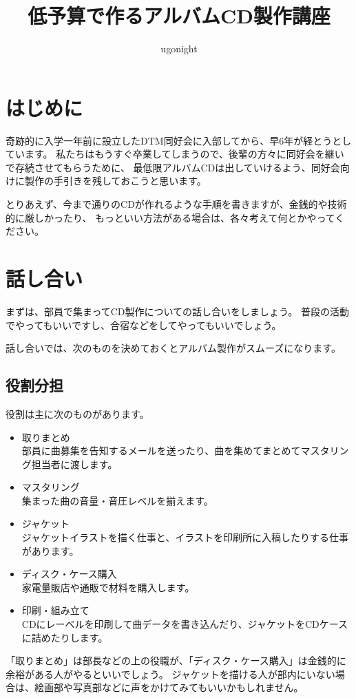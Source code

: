 \documentclass[11pt,a4paper]{jsarticle}
\title{低予算で作るアルバムCD製作講座}
\author{ugonight}
\begin{document}
%
%
    \maketitle

    \tableofcontents

    \section{はじめに}
        奇跡的に入学一年前に設立したDTM同好会に入部してから、早6年が経とうとしています。
        私たちはもうすぐ卒業してしまうので、後輩の方々に同好会を継いで存続させてもらうために、
        最低限アルバムCDは出していけるよう、同好会向けに製作の手引きを残しておこうと思います。
        
        とりあえず、今まで通りのCDが作れるような手順を書きますが、金銭的や技術的に厳しかったり、
        もっといい方法がある場合は、各々考えて何とかやってください。




    \section{話し合い}
        まずは、部員で集まってCD製作についての話し合いをしましょう。
        普段の活動でやってもいいですし、合宿などをしてやってもいいでしょう。

        話し合いでは、次のものを決めておくとアルバム製作がスムーズになります。

        \subsection{役割分担}
            役割は主に次のものがあります。
            \begin{itemize}
                \item 取りまとめ \\
                    部員に曲募集を告知するメールを送ったり、曲を集めてまとめてマスタリング担当者に渡します。
                \item マスタリング \\
                    集まった曲の音量・音圧レベルを揃えます。
                \item ジャケット \\
                    ジャケットイラストを描く仕事と、イラストを印刷所に入稿したりする仕事があります。
                \item ディスク・ケース購入 \\
                    家電量販店や通販で材料を購入します。
                \item 印刷・組み立て \\
                    CDにレーベルを印刷して曲データを書き込んだり、ジャケットをCDケースに詰めたりします。
            \end{itemize}
            「取りまとめ」は部長などの上の役職が、「ディスク・ケース購入」は金銭的に余裕がある人がやるといいでしょう。
            ジャケットを描ける人が部内にいない場合は、絵画部や写真部などに声をかけてみてもいいかもしれません。
            
\end{document}
